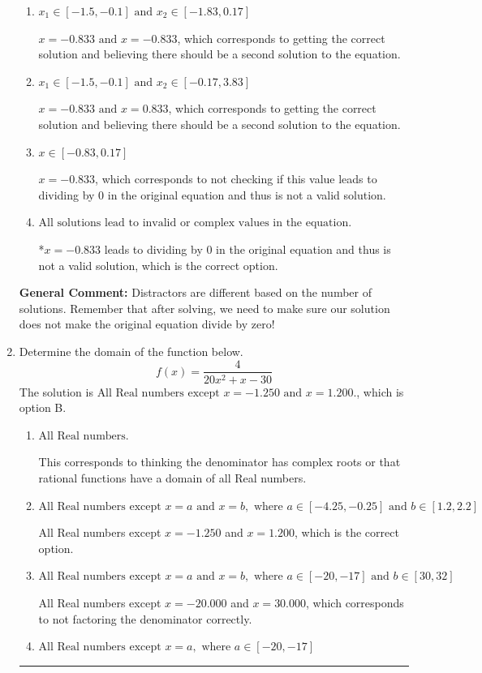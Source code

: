 \documentclass{extbook}[14pt]
\newcommand{\litem}[1]{\item #1

\rule{\textwidth}{0.4pt}}
\begin{document}
\begin{enumerate}
{\begin{enumerate}[label=\Alph*.]
$x = 0.833$, which corresponds to not distributing the factor $-72x -60$ correctly when trying to eliminate the fraction.
\item \( x_1 \in [-1.5, -0.1] \text{ and } x_2 \in [-1.83,0.17] \)

$x = -0.833 \text{ and } x = -0.833$, which corresponds to getting the correct solution and believing there should be a second solution to the equation.
\item \( x_1 \in [-1.5, -0.1] \text{ and } x_2 \in [-0.17,3.83] \)

$x = -0.833 \text{ and } x = 0.833$, which corresponds to getting the correct solution and believing there should be a second solution to the equation.
\item \( x \in [-0.83,0.17] \)

$x = -0.833$, which corresponds to not checking if this value leads to dividing by 0 in the original equation and thus is not a valid solution.
\item \( \text{All solutions lead to invalid or complex values in the equation.} \)

*$x = -0.833$ leads to dividing by 0 in the original equation and thus is not a valid solution, which is the correct option.
\end{enumerate}

\textbf{General Comment:} Distractors are different based on the number of solutions. Remember that after solving, we need to make sure our solution does not make the original equation divide by zero!
}
\litem{
Determine the domain of the function below.
\[ f(x) = \frac{4}{20x^{2} +x -30} \]
The solution is \( \text{All Real numbers except } x = -1.250 \text{ and } x = 1.200. \), which is option B.\begin{enumerate}[label=\Alph*.]
\item \( \text{All Real numbers.} \)

This corresponds to thinking the denominator has complex roots or that rational functions have a domain of all Real numbers.
\item \( \text{All Real numbers except } x = a \text{ and } x = b, \text{ where } a \in [-4.25, -0.25] \text{ and } b \in [1.2, 2.2] \)

All Real numbers except $x = -1.250$ and $x = 1.200$, which is the correct option.
\item \( \text{All Real numbers except } x = a \text{ and } x = b, \text{ where } a \in [-20, -17] \text{ and } b \in [30, 32] \)

All Real numbers except $x = -20.000$ and $x = 30.000$, which corresponds to not factoring the denominator correctly.
\item \( \text{All Real numbers except } x = a, \text{ where } a \in [-20, -17] \)


\end{enumerate}}
\end{enumerate}
\end{document}
